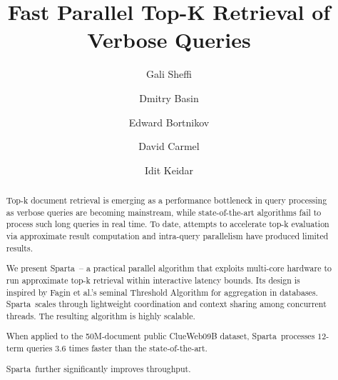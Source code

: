 \documentclass[runningheads]{llncs}
\newcommand{\alg}{Sparta}
\newcommand{\bigdataset}[1]{} %
\begin{document}

\title{Fast Parallel Top-K Retrieval of Verbose Queries}

\author{Gali Sheffi\and %
Dmitry Basin\and %
Edward Bortnikov\and %
David Carmel\and %
Idit Keidar %
}


\maketitle




\begin{abstract}
Top-k document retrieval is emerging as a performance bottleneck in query processing as verbose queries are becoming 
mainstream, while state-of-the-art algorithms fail to process such long queries in real time. To date, attempts to
accelerate top-k evaluation 
via approximate result computation and intra-query parallelism have produced limited results. 

We present \alg\ -- a practical parallel algorithm that exploits multi-core hardware to run approximate top-k retrieval 
within interactive latency bounds. Its design is inspired by  Fagin et al.'s seminal Threshold Algorithm for  aggregation in databases. 
\alg\ scales through lightweight coordination and context sharing among concurrent threads. The resulting algorithm 
is highly scalable.
\bigdataset{ 
both in the number of query terms and in the searched index size. 
}
When applied to the 50M-document public ClueWeb09B 
dataset, \alg\  processes $12$-term queries $3.6$ times faster than the state-of-the-art. 
\bigdataset{
On a tenfold  bigger index, 
\alg\ continues to process queries at the same speed, whereas today's best-in-class algorithm is more than 60 times slower. 
}
\alg\ further significantly improves throughput.%

\end{abstract}










  
\end{document}
